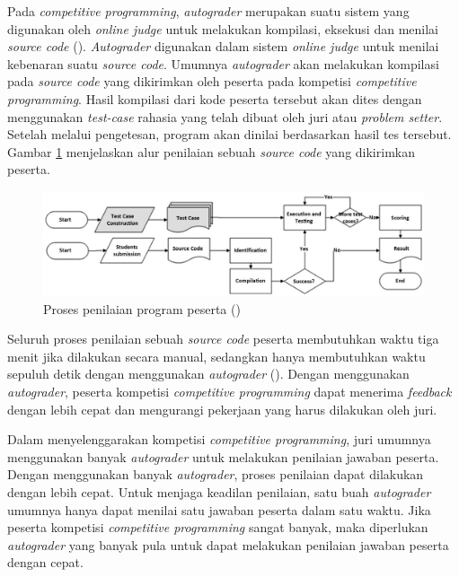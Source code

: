 \par Pada \textit{competitive programming}, \textit{autograder} merupakan suatu sistem yang digunakan oleh \textit{online judge} untuk melakukan kompilasi, eksekusi dan menilai \textit{source code} (\cite{danutamalms}). \textit{Autograder} digunakan dalam sistem \textit{online judge} untuk menilai kebenaran suatu \textit{source code}. Umumnya \textit{autograder} akan melakukan kompilasi pada \textit{source code} yang dikirimkan oleh peserta pada kompetisi \textit{competitive programming}. Hasil kompilasi dari kode peserta tersebut akan dites dengan menggunakan \textit{test-case} rahasia yang telah dibuat oleh juri atau \textit{problem setter}. Setelah melalui pengetesan, program akan dinilai berdasarkan hasil tes tersebut. Gambar \ref{fig:grading-process} menjelaskan alur penilaian sebuah \textit{source code} yang dikirimkan peserta.

\begin{figure}
	\centering
	\includegraphics[width=\textwidth]{images/grading-process}
	\caption{Proses penilaian program peserta (\cite{danutamalms})}
	\label{fig:grading-process}
\end{figure}

\par Seluruh proses penilaian sebuah \textit{source code} peserta membutuhkan waktu tiga menit jika dilakukan secara manual, sedangkan hanya membutuhkan waktu sepuluh detik dengan menggunakan \textit{autograder} (\cite{danutamalms}). Dengan menggunakan \textit{autograder}, peserta kompetisi \textit{competitive programming} dapat menerima \textit{feedback} dengan lebih cepat dan mengurangi pekerjaan yang harus dilakukan oleh juri.

\par Dalam menyelenggarakan kompetisi \textit{competitive programming}, juri umumnya menggunakan banyak \textit{autograder} untuk melakukan penilaian jawaban peserta. Dengan menggunakan banyak \textit{autograder}, proses penilaian dapat dilakukan dengan lebih cepat. Untuk menjaga keadilan penilaian, satu buah \textit{autograder} umumnya hanya dapat menilai satu jawaban peserta dalam satu waktu. Jika peserta kompetisi \textit{competitive programming} sangat banyak, maka diperlukan \textit{autograder} yang banyak pula untuk dapat melakukan penilaian jawaban peserta dengan cepat.

